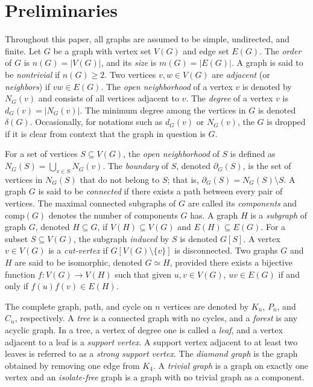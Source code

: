 \documentclass[11pt]{article}
\theoremstyle{definition}
\newcommand{\comp}{\mathrm{comp}}
\newcommand{\1}{\vspace{0.1cm}}
\newcommand{\2}{\vspace{0.2cm}}
\newcommand{\3}{\vspace{0.3cm}}
\begin{document}
\section{Preliminaries} 
\label{sec:preliminaries}

Throughout this paper, all graphs are assumed to be simple, undirected, and finite. Let $G$ be a graph with vertex set $V(G)$ and edge set $E(G)$. The \emph{order} of $G$ is $n(G) = |V(G)|$, and its \emph{size} is $m(G) = |E(G)|$. A graph is said to be \emph{nontrivial} if $n(G) \geq 2$. Two vertices $v, w \in V(G)$ are \emph{adjacent} (or \emph{neighbors}) if $vw \in E(G)$. The \emph{open neighborhood} of a vertex $v$ is denoted by $N_G(v)$ and consists of all vertices adjacent to $v$.
The \emph{degree} of a vertex $v$ is $d_G(v) = |N_G(v)|$. The minimum degree among the vertices in $G$ is denoted $\delta(G)$.  Occasionally, for notations such as $d_G(v)$ or $N_G(v)$, the $G$ is dropped if it is clear from context that the graph in question is $G$.

For a set of vertices $S \subseteq V(G)$, the \emph{open neighborhood} of $S$ is defined as $N_G(S) = \bigcup_{v \in S} N_G(v)$.
The \emph{boundary} of $S$, denoted $\partial_G(S)$, is the set of vertices in $N_G(S)$ that do not belong to $S$; that is, $\partial_G(S) = N_G(S) \setminus S$. A graph $G$ is said to be \emph{connected} if there exists a path between every pair of vertices. The maximal connected subgraphs of $G$ are called its \emph{components} and $\comp(G)$ denotes the number of components $G$ has. A graph $H$ is a \emph{subgraph} of graph $G$, denoted $H \subseteq G$, if $V(H) \subseteq V(G)$ and $E(H) \subseteq E(G)$. For a subset $S \subseteq V(G)$, the subgraph \emph{induced} by $S$ is denoted $G[S]$. A vertex $v \in V(G)$ is a \emph{cut-vertex} if $G[V(G) \setminus \{v\}]$ is disconnected.  Two graphs $G$ and $H$ are said to be isomorphic, denoted $G \simeq H$, provided there exists a bijective function $f:V(G) \rightarrow V(H)$ such that given $u,v \in V(G)$, $uv \in E(G)$ if and only if $f(u)f(v) \in E(H)$.

The complete graph, path, and cycle on $n$ vertices are denoted by $K_n$, $P_n$, and $C_n$, respectively. A \emph{tree} is a connected graph with no cycles, and a \emph{forest} is any acyclic graph. In a tree, a vertex of degree one is called a \emph{leaf}, and a vertex adjacent to a leaf is a \emph{support vertex}. A support vertex adjacent to at least two leaves is referred to as a \emph{strong support vertex}. The \emph{diamond graph} is the graph obtained by removing one edge from $K_4$. A \emph{trivial graph} is a graph on exactly one vertex and an \emph{isolate-free} graph is a graph with no trivial graph as a component. 
\end{document}
